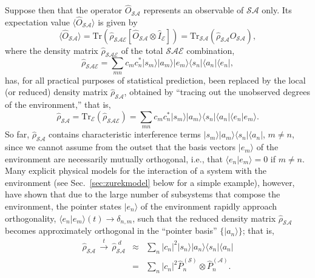 \documentclass[rmp,aps,amsmath,amsfonts,noshowkeys,noshowpacs,12pt]{revtex4}
\newcommand{\ket}[1]{\ensuremath{|{#1\rangle}}}
\newcommand{\bra}[1]{\ensuremath{{\langle #1}|}}
\begin{document}
Suppose then that the operator $\widehat{O}_\mathcal{SA}$ represents
an observable of $\mathcal{SA}$ only.  Its expectation value $\langle
\widehat{O}_\mathcal{SA} \rangle $ is given by
%
\begin{equation} \label{eq:global-to-local} 
\langle
\widehat{O}_{\mathcal{SA}} \rangle = \text{Tr}
(\widehat{\rho}_\mathcal{SAE}
[\widehat{O}_\mathcal{SA} \otimes
\widehat{I}_\mathcal{E}]) = \text{Tr}_\mathcal{SA}
(\widehat{\rho}_\mathcal{SA}
\widehat{O}_\mathcal{SA}), 
\end{equation}
%
where the density matrix $\widehat{\rho}_{\mathcal{SAE}}$ of the total
$\mathcal{SAE}$ combination,
%
\begin{equation} \widehat{\rho}_{\mathcal{SAE}} = \sum_{mn} c_m c_n^*
\ket{s_m} \ket{a_m} \ket{e_m}
\bra{s_n} \bra{a_n} \bra{e_n}, \end{equation}
%
has, for all practical purposes of statistical prediction, been
replaced by the local (or reduced) density matrix
$\widehat{\rho}_{\mathcal{SA}}$, obtained by ``tracing out
the unobserved degrees of the environment,'' that is,
%
\begin{equation} \label{eq:rho-S+A} \widehat{\rho}_\mathcal{SA} =
\mathrm{Tr}_\mathcal{E} (\widehat{\rho}_\mathcal{SAE})
= \sum_{mn} c_m c_n^* \ket{s_m} \ket{a_m} \bra{s_n}\bra{a_n}
\langle e_n | e_m \rangle.  
\end{equation}
%
So far, $\widehat{\rho}_{\mathcal{SA}}$ contains characteristic
interference terms $\ket{s_m} \ket{a_m} \bra{s_n}\bra{a_n}$, $m \not=
n$, since we cannot assume from the outset that the basis vectors
$\ket{e_m}$ of the environment are necessarily mutually orthogonal,
i.e., that $\langle e_n | e_m \rangle = 0$ if $m \not= n$. Many
explicit physical models for the interaction of a system with the
environment (see Sec.~\ref{sec:zurekmodel} below for a simple
example), however, have shown that due to the large number of
subsystems that compose the environment, the pointer states
$\ket{e_n}$ of the environment rapidly approach orthogonality,
$\langle e_n | e_m \rangle (t) \rightarrow \delta_{n,m}$, such that
the reduced density matrix $\widehat{\rho}_{\mathcal{SA}}$ becomes
approximately orthogonal in the ``pointer basis'' $\{ \ket{a_n} \}$;
that is,
%
\begin{eqnarray} \label{eq:rho-S+A-diagonal} 
\widehat{\rho}_{\mathcal{SA}} \,
\stackrel{t}{\longrightarrow} \, \widehat{\rho}^{\,\,d}_{\mathcal{SA}}
& \approx &
\sum_n |c_n|^2 \ket{s_n} \ket{a_n}
\bra{s_n} \bra{a_n} \nonumber \\ &=& \sum_n |c_n|^2
\widehat{P}^{(\mathcal{S})}_n \otimes \widehat{P}^{(\mathcal{A})}_n. 
\end{eqnarray}
\end{document}
